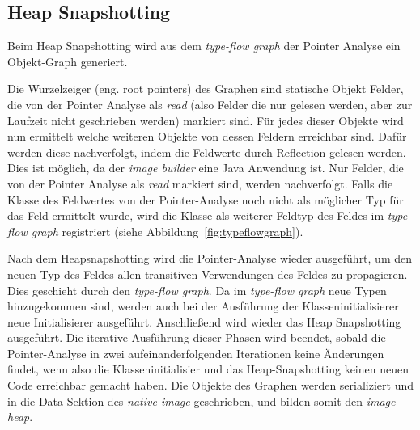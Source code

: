 \subsection{Heap Snapshotting}
\label{subsec:heapsnapshotting}
Beim Heap Snapshotting wird aus dem \textit{type-flow graph} der Pointer Analyse ein Objekt-Graph generiert.

Die Wurzelzeiger (eng. root pointers) des Graphen sind statische Objekt Felder, die von der Pointer Analyse als \textit{read} (also Felder die nur gelesen werden, aber zur Laufzeit nicht geschrieben werden) markiert sind. Für jedes dieser Objekte wird nun ermittelt welche weiteren Objekte von dessen Feldern erreichbar sind. Dafür werden diese nachverfolgt, indem die Feldwerte durch Reflection gelesen werden. Dies ist möglich, da der \textit{image builder} eine Java Anwendung ist. Nur Felder, die von der Pointer Analyse als \textit{read} markiert sind, werden nachverfolgt. Falls die Klasse des Feldwertes von der Pointer-Analyse noch nicht als möglicher Typ für das Feld ermittelt wurde, wird die Klasse als weiterer Feldtyp des Feldes im \textit{type-flow graph} registriert (siehe Abbildung~\ref{fig:typeflowgraph}).

Nach dem Heapsnapshotting wird die Pointer-Analyse wieder ausgeführt, um den neuen Typ des Feldes allen transitiven Verwendungen des Feldes zu propagieren. Dies geschieht durch den \textit{type-flow graph}. Da im \textit{type-flow graph} neue Typen hinzugekommen sind, werden auch bei der Ausführung der Klasseninitialisierer neue Initialisierer ausgeführt. Anschließend wird wieder das Heap Snapshotting ausgeführt. 
Die iterative Ausführung dieser Phasen wird beendet, sobald die Pointer-Analyse in zwei aufeinanderfolgenden Iterationen keine Änderungen findet, wenn also die Klasseninitialisier und das Heap-Snapshotting keinen neuen Code erreichbar gemacht haben.
Die Objekte des Graphen werden serializiert und in die Data-Sektion des \textit{native image} geschrieben, und bilden somit den \textit{image heap}.
